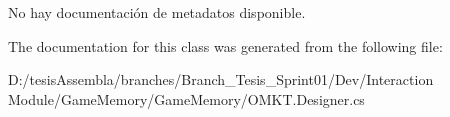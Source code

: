 No hay documentación de metadatos disponible. 



The documentation for this class was generated from the following file\-:\begin{DoxyCompactItemize}
\item 
D\-:/tesis\-Assembla/branches/\-Branch\-\_\-\-Tesis\-\_\-\-Sprint01/\-Dev/\-Interaction Module/\-Game\-Memory/\-Game\-Memory/O\-M\-K\-T.\-Designer.\-cs\end{DoxyCompactItemize}
